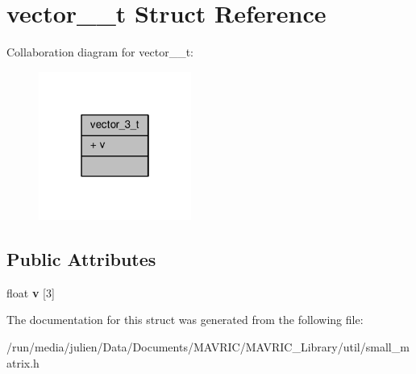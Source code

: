 \hypertarget{structvector__3__t}{\section{vector\+\_\+\_\+t Struct Reference}
\label{structvector__3__t}
}


Collaboration diagram for vector\+\_\+\_\+t\+:
\nopagebreak
\begin{figure}[H]
\begin{center}
\leavevmode
\includegraphics[width=142pt]{structvector__3__t__coll__graph}
\end{center}
\end{figure}
\subsection*{Public Attributes}
\begin{DoxyCompactItemize}
\item 
\hypertarget{structvector__3__t_af58dde62589357dcb3ba77562c0c98af}{float {\bfseries v} \mbox{[}3\mbox{]}}\label{structvector__3__t_af58dde62589357dcb3ba77562c0c98af}

\end{DoxyCompactItemize}


The documentation for this struct was generated from the following file\+:\begin{DoxyCompactItemize}
\item 
/run/media/julien/\+Data/\+Documents/\+M\+A\+V\+R\+I\+C/\+M\+A\+V\+R\+I\+C\+\_\+\+Library/util/small\+\_\+matrix.\+h\end{DoxyCompactItemize}
